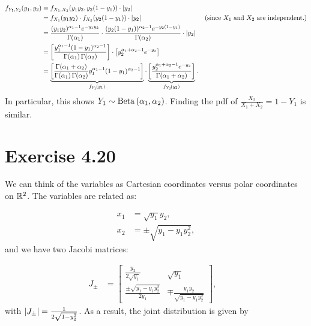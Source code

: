 \documentclass[12pt,letterpaper,reqno]{amsart}
\numberwithin{equation}{subsection}
\begin{document}
\begin{enumerate}[label=(\alph*),leftmargin=*]
    \begin{align*}
        \fun{f_{Y_1, Y_2}}{y_1, y_2} &= \fun{f_{X_1, X_2}}{y_1 y_2,y_2 (1-y_1)} \cdot \Abs{y_2} \\
        &= \fun{f_{X_1}}{y_1y_2} \cdot \fun{f_{X_2}}{y_2(1-y_1)} \cdot \Abs{y_2} & \left( \mbox{since $X_1$ and $X_2$ are independent.} \right) \\
            &= \frac{(y_1y_2)^{\alpha_1 - 1} e^{-y_1 y_2}}{\fun{\Gamma}{\alpha_1}} \cdot \frac{(y_2(1-y_1))^{\alpha_2-1} e^{-y_2(1-y_1)}}{\fun{\Gamma}{\alpha_2}} \cdot \Abs{y_2} \\
            &= \left[ \frac{y_1^{\alpha_1 - 1} (1-y_1)^{\alpha_2 - 1}}{\fun{\Gamma}{\alpha_1} \fun{\Gamma}{\alpha_2}} \right] \cdot \left[ y_2^{\alpha_1 + \alpha_2 - 1} e^{-y_2} \right] \\
            &= \underbrace{\left[ \frac{\fun{\Gamma}{\alpha_1 + \alpha_2}}{\fun{\Gamma}{\alpha_1} \fun{\Gamma}{\alpha_2}} y_1^{\alpha_1 - 1} (1-y_1)^{\alpha_2 - 1} \right]}_{\fun{f_{Y_1}}{y_1}} \cdot \underbrace{\left[ \frac{y_2^{\alpha_1 + \alpha_2 - 1} e^{-y_2}}{\fun{\Gamma}{\alpha_1 + \alpha_2}} \right]}_{{\fun{f_{Y_2}}{y_2}}}.
    \end{align*}
    In particular, this shows $Y_1 \sim \operatorname{Beta}\left( {\alpha_1, \alpha_2} \right)$. Finding the pdf of $\frac{X_2}{X_1 + X_2} = 1 - Y_1$ is similar.
\end{enumerate}

\newpage
\section{Exercise 4.20}

We can think of the variables as Cartesian coordinates versus polar coordinates on $\mathbb{R}^2$. The variables are related as:

\begin{align*}
    x_1 &= \sqrt{y_1} y_2, \\
    x_2 &= \pm \sqrt{y_1 - y_1 y_2^2},
\end{align*}
and we have two Jacobi matrices:

\begin{align*}
      J_{\pm} &= \left[ \begin{array}{cc}
           \frac{y_2}{2\sqrt{y_1}} & \sqrt{y_1} \\
           \frac{\pm \sqrt{y_1 - y_1 y_2^2}}{2y_1} & \mp \frac{y_1 y_2}{\sqrt{y_1 - y_1 y_2^2}}
      \end{array} \right], & 
\end{align*}
with $\left\lvert{J_{\pm}}\right\rvert = \frac{1}{2\sqrt{1 - y_2^2}}$. As a result, the joint distribution is given by
\end{document}
